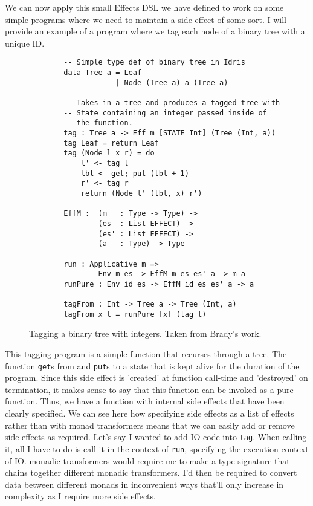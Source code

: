We can now apply this small Effects DSL we have defined to work on some simple
programs where we need to maintain a side effect of some sort. I will provide an
example of a program where we tag each node of a binary tree with a unique ID. 

\begin{figure}[ht!!!!]
    \caption{Tagging a binary tree with integers. Taken from Brady's work.
    \protect\cite{algebraic}}
    \label{tag_def}
    \begin{lstlisting}
        -- Simple type def of binary tree in Idris
        data Tree a = Leaf
                    | Node (Tree a) a (Tree a)
        
        -- Takes in a tree and produces a tagged tree with
        -- State containing an integer passed inside of
        -- the function. 
        tag : Tree a -> Eff m [STATE Int] (Tree (Int, a))
        tag Leaf = return Leaf
        tag (Node l x r) = do
            l' <- tag l
            lbl <- get; put (lbl + 1)
            r' <- tag r
            return (Node l' (lbl, x) r')
        
        EffM :  (m   : Type -> Type) ->
                (es  : List EFFECT) ->
                (es' : List EFFECT) ->
                (a   : Type) -> Type
        
        run : Applicative m => 
                Env m es -> EffM m es es' a -> m a
        runPure : Env id es -> EffM id es es' a -> a

        tagFrom : Int -> Tree a -> Tree (Int, a)
        tagFrom x t = runPure [x] (tag t)
    \end{lstlisting}
\end{figure}

This tagging program is a simple function that recurses through a tree. The
function \texttt{get}s from and \texttt{put}s to a state that is kept alive for
the duration of the program. Since this side effect is 'created' at function
call-time and 'destroyed' on termination, it makes sense to say that this
function can be invoked as a pure function. Thus, we have a function with
internal side effects that have been clearly specified. We can see here how
specifying side effects as a list of effects rather than with monad transformers
means that we can easily add or remove side effects as required. Let's say I
wanted to add IO code into \texttt{tag}. When calling it, all I have to do is
call it in the context of \texttt{run}, specifying the execution context of IO.
monadic transformers would require me to make a type signature that chains
together different monadic transformers. I'd then be required to convert data
between different monads in inconvenient ways that'll only increase in
complexity as I require more side effects.

